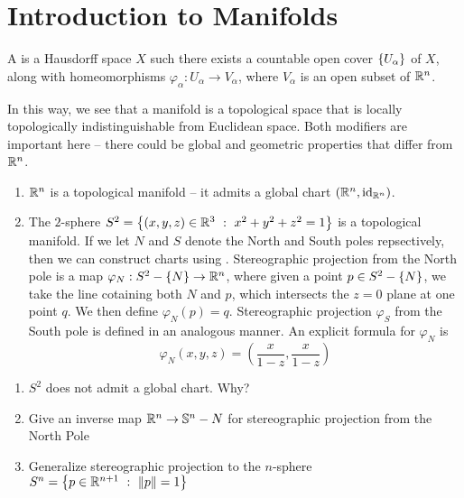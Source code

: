 \section{Introduction to Manifolds}
%
\begin{defn}
A  is a Hausdorff space $X$ such there exists a countable open cover $\left\lbrace U_\alpha \right\rbrace$ of $X$, along with homeomorphisms $\varphi_\alpha : U_\alpha \to V_\alpha$, where $V_\alpha$ is an open subset of $\mathbb{R}^n$.
\end{defn}
%
In this way, we see that a manifold is a topological space that is locally topologically indistinguishable from
Euclidean space. Both modifiers are important here -- there could be global and geometric properties that 
differ from $\mathbb{R}^n$.
%
\begin{exmp}\enumbreak 
	\begin{enumerate}
		\item $\mathbb{R}^n$ is a topological manifold -- it admits a global chart $(\mathbb{R}^n, \operatorname{id}_{\mathbb{R}^n})$.
		\item The $2$-sphere $S^2 = \left\lbrace (x,y,z) \in \mathbb{R}^3 ~:~ x^2 + y^2 + z^2 = 1 \right\rbrace$ is a topological
		manifold. If we let $N$ and $S$ denote the North and South poles repsectively, then we can 
		construct charts using . Stereographic projection from the North
		pole is a map $\varphi_N : S^2 - \left\lbrace N \right\rbrace \to \mathbb{R}^n$, where given a point $p \in S^2 - \left\lbrace N \right\rbrace$,
		we take the line cotaining both $N$ and $p$, which intersects the $z = 0 $ plane at one point 
		$q$. We then define $\varphi_N(p) = q$. Stereographic projection $\varphi_S$ from the South 
		pole is defined in an analogous manner. An explicit formula for $\varphi_N$ is 
		$$\varphi_N(x,y,z) = \left(\frac{x}{1 - z}, \frac{x}{1 - z} \right) $$
	\end{enumerate}
\end{exmp}
%
\begin{exer}\enumbreak
	\begin{enumerate}
		\item $S^2$ does not admit a global chart. Why?
		\item Give an inverse map $\mathbb{R}^n \to \mathbb{S}^n - {N}$ for stereographic projection from the 
			North Pole
		\item Generalize stereographic projection to the $n$-sphere 
		$S^n = \left\lbrace p \in \mathbb{R}^{n+1} ~:~ \left\lVert p\right\rVert = 1 \right\rbrace$
	\end{enumerate}
\end{exer}
